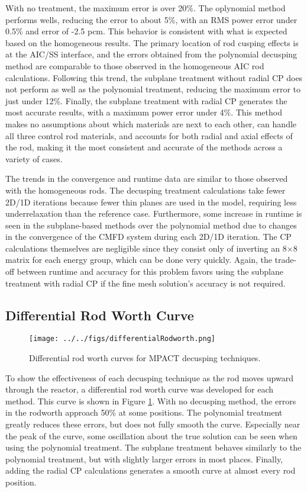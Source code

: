 With no treatment, the maximum error is over 20\%.  The oplynomial method performs wells, reducing the error to about 5\%, with an RMS power error under 0.5\% and \keff{} error of -2.5 pcm.  This behavior is consistent with what is expected based on the homogeneous results.  The primary location of rod cusping effects is at the AIC/SS interface, and the errors obtained from the polynomial decusping method are comparable to those observed in the homogeneous AIC rod calculations.  Following this trend, the subplane treatment without radial CP does not perform as well as the polynomial treatment, reducing the maximum error to just under 12\%.  Finally, the subplane treatment with radial CP generates the most accurate results, with a maximum power error under 4\%.  This method makes no assumptions about which materials are next to each other, can handle all three control rod materials, and accounts for both radial and axial effects of the rod, making it the most consistent and accurate of the methods across a variety of cases.

The trends in the convergence and runtime data are similar to those observed with the homogeneous rods.  The decusping treatment calculations take fewer 2D/1D iterations because fewer thin planes are used in the model, requiring less underrelaxation than the reference case.  Furthermore, some increase in runtime is seen in the subplane-based methods over the polynomial method due to changes in the convergence of the CMFD system during each 2D/1D iteration.  The CP calculations themselves are negligible since they consist only of inverting an 8$\times$8 matrix for each energy group, which can be done very quickly.  Again, the trade-off between runtime and accuracy for this problem favors using the subplane treatment with radial CP if the fine mesh solution's accuracy is not required.

\subsection{Differential Rod Worth Curve}

\begin{figure}[h]
    \centering
    \texttt{[image: ../../figs/differentialRodworth.png]}
    \caption{Differential rod worth curves for MPACT decusping 
        techniques.}\label{f:rodworth}
\end{figure}

To show the effectiveness of each decusping technique as the rod moves upward through the reactor, a differential rod worth curve was developed for each method.  This curve is shown in Figure \ref{f:rodworth}.  With no decusping method, the errors in the rodworth approach 50\% at some positions.  The polynomial treatment greatly reduces these errors, but does not fully smooth the curve.  Especially near the peak of the curve, some oscillation about the true solution can be seen when using the polynomial treatment.  The subplane treatment behaves similarly to the polynomial treatment, but with slightly larger errors in most places.  Finally, adding the radial CP calculations generates a smooth curve at almost every rod position.

